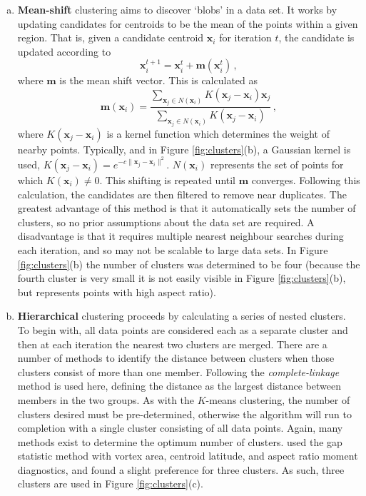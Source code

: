 \begin{enumerate}[(a)]
\item \textbf{Mean-shift} clustering aims to discover `blobs' in a data set. It
  works by updating candidates for centroids to be the mean of the points within
  a given region. That is, given a candidate centroid $\mathbf{x}_i$ for
  iteration $t$, the candidate is updated according to
  \begin{equation}
    \mathbf{x}^{t+1}_{i} = \mathbf{x}^t_i + \mathbf{m}(\mathbf{x}^t_i) \, ,
  \end{equation}
 where $\mathbf{m}$ is the mean shift vector. This is calculated as
 \begin{equation}
  \mathbf{m}(\mathbf{x}_i) = \frac{\sum_{\mathbf{x}_j \in N(\mathbf{x}_i)}K(\mathbf{x}_j-\mathbf{x}_i)\mathbf{x}_j}{\sum_{\mathbf{x}_j
      \in N(\mathbf{x}_i)}K(\mathbf{x}_j-\mathbf{x}_i)} \, ,
 \end{equation}
 where $K(\mathbf{x}_j-\mathbf{x}_i)$ is a kernel function which determines the
 weight of nearby points. Typically, and in Figure \ref{fig:clusters}(b), a
 Gaussian kernel is used,
 $K(\mathbf{x}_j-\mathbf{x}_i) = e^{-c\|\mathbf{x}_j-\mathbf{x}_i\|^2}$.
 $N(\mathbf{x}_i)$ represents the set of points for which
 $K(\mathbf{x}_i) \ne 0$. This shifting is repeated until $\mathbf{m}$
 converges. Following this calculation, the candidates are then filtered to
 remove near duplicates. The greatest advantage of this method is that it
 automatically sets the number of clusters, so no prior assumptions about the
 data set are required. A disadvantage is that it requires multiple nearest
 neighbour searches during each iteration, and so may not be scalable to large
 data sets. In Figure \ref{fig:clusters}(b) the number of clusters was
 determined to be four (because the fourth cluster is very small it is not
 easily visible in Figure \ref{fig:clusters}(b), but represents points with high
 aspect ratio).

\item \textbf{Hierarchical} clustering proceeds by calculating a series of
  nested clusters. To begin with, all data points are considered each as a
  separate cluster and then at each iteration the nearest two clusters are
  merged. There are a number of methods to identify the distance between
  clusters when those clusters consist of more than one member. Following
  \citet{Hannachi2010} the \emph{complete-linkage} method is used here, defining
  the distance as the largest distance between members in the two groups. As
  with the $K$-means clustering, the number of clusters desired must be
  pre-determined, otherwise the algorithm will run to completion with a single
  cluster consisting of all data points. Again, many methods exist to determine
  the optimum number of clusters. \citet{Hannachi2010} used the gap statistic
  method \citep{Tibshirani2001} with vortex area, centroid latitude, and aspect
  ratio moment diagnostics, and found a slight preference for three clusters. As
  such, three clusters are used in Figure \ref{fig:clusters}(c).

\end{enumerate}

